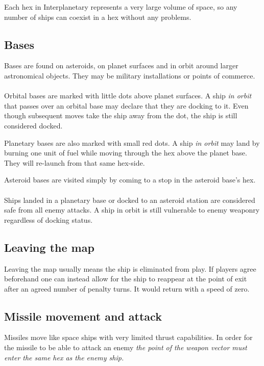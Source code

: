 \documentclass[a4paper,12pt,notitlepage,twocolumn]{article}
\begin{document}
Each hex in Interplanetary represents a very large volume of space, so any
number of ships can coexist in a hex without any problems. 

\subsection{Bases}

Bases are found on asteroids, on planet surfaces and in orbit around
larger astronomical objects. They may be military installations or points of commerce. 
\\\\
Orbital bases are marked with little dots above planet surfaces. A ship \emph{in
  orbit} that passes over an orbital base may declare that they are 
  docking to it. Even though subsequent moves take the ship away from
  the dot, the ship is still considered docked. 

Planetary bases are also marked with small red dots. A ship \emph{in orbit}
may land by burning one unit of fuel while moving through the hex above 
the planet base. They will re-launch from that same hex-side.

Asteroid bases are visited simply by coming to a stop in the asteroid base's hex.
\\\\
Ships landed in a planetary base or docked to an asteroid station are
considered safe from all enemy attacks. A ship in orbit is still vulnerable to 
enemy weaponry regardless of docking status.

\subsection{Leaving the map}

Leaving the map usually means the ship is eliminated from play. If
players agree beforehand one can instead allow for the ship to reappear at the
point of exit after an agreed number of penalty turns. It would return
with a speed of zero.  

\subsection{Missile movement and attack}
\label{sec:missile_movement_and_attack}

Missiles move like space ships with very limited thrust capabilities. 
In order for the missile to be able to attack an enemy
\emph{the point of the weapon vector must enter the same hex as the enemy ship.}
\end{document}
